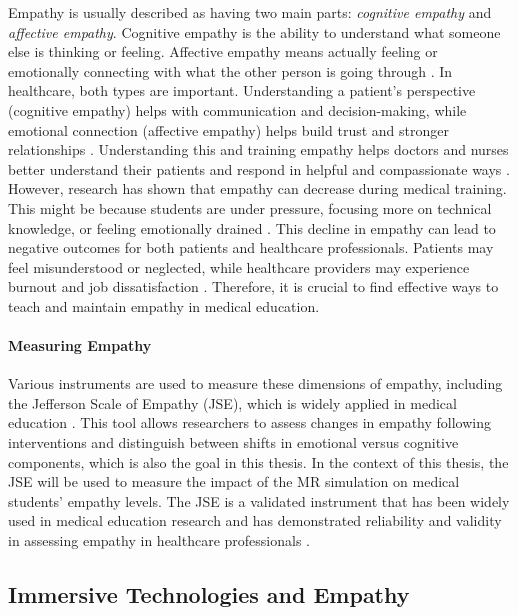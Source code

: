 \vspace{1em}

Empathy is usually described as having two main parts: \textit{cognitive empathy} and \textit{affective empathy}. Cognitive empathy is the ability to understand what someone else is thinking or feeling. Affective empathy means actually feeling or emotionally connecting with what the other person is going through \cite{Ventura2020, Martingano2021}. In healthcare, both types are important. Understanding a patient's perspective (cognitive empathy) helps with communication and decision-making, while emotional connection (affective empathy) helps build trust and stronger relationships \cite{Cunico2012, Ozcan2018}.  Understanding this and training empathy helps doctors and nurses better understand their patients and respond in helpful and compassionate ways \cite{Ozcan2018, Olson1995}. However, research has shown that empathy can decrease during medical training. This might be because students are under pressure, focusing more on technical knowledge, or feeling emotionally drained \cite{Mattsson2024, Ozcan2018}. This decline in empathy can lead to negative outcomes for both patients and healthcare professionals. Patients may feel misunderstood or neglected, while healthcare providers may experience burnout and job dissatisfaction \cite{Mattsson2024, Cunico2012}. Therefore, it is crucial to find effective ways to teach and maintain empathy in medical education.

\paragraph{Measuring Empathy}
Various instruments are used to measure these dimensions of empathy, including the Jefferson Scale of Empathy (JSE), which is widely applied in medical education \cite{Alieldin2024}. This tool allows researchers to assess changes in empathy following interventions and distinguish between shifts in emotional versus cognitive components, which is also the goal in this thesis. In the context of this thesis, the JSE will be used to measure the impact of the MR simulation on medical students' empathy levels. The JSE is a validated instrument that has been widely used in medical education research and has demonstrated reliability and validity in assessing empathy in healthcare professionals \cite{Hojat2002}. 

\subsection{Immersive Technologies and Empathy}

